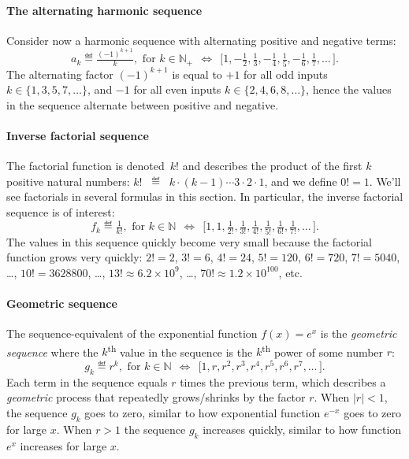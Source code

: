 		\paragraph{The alternating harmonic sequence}

			Consider now a harmonic sequence with alternating positive and negative terms:
			\[
				a_k \eqdef \tfrac{(-1)^{k+1}}{k}, \text{ for } k \in \mathbb{N}_+
				  \ \ \Leftrightarrow \ \ 
				  \big[ 1, -\tfrac{1}{2}, \tfrac{1}{3}, -\tfrac{1}{4}, \tfrac{1}{5}, -\tfrac{1}{6}, \tfrac{1}{7}, \ldots \, \big].
			\]
			The alternating factor $(-1)^{k+1}$ is equal to $+1$
			for all odd inputs $k \in \{1,3,5,7,\ldots \}$,
			and $-1$ for all even inputs $k \in \{2,4,6,8,\ldots \}$,
			hence the values in the sequence alternate between positive and negative.


		\paragraph{Inverse factorial sequence}

			The factorial function is denoted~$k!$
			and describes the product of the first $k$ positive natural numbers:
			$k! \;\; \eqdef \;\; k \cdot (k-1) \cdots 3 \cdot 2 \cdot 1$,
			and we define $0! = 1$.
			We'll see factorials in several formulas in this section.
			In particular,
			the inverse factorial sequence is of interest:
			\[
				f_k\eqdef \tfrac{1}{k!}, \text{ for } k \in \mathbb{N}
				  \ \ \Leftrightarrow \ \ 
				  \big[1, 1, \tfrac{1}{2!}, \tfrac{1}{3!}, \tfrac{1}{4!}, \tfrac{1}{5!}, \tfrac{1}{6!}, \tfrac{1}{7!}, \ldots \, \big].
			\]
			The values in this sequence quickly become very small
			because the factorial function grows very quickly:
			$2!=2$,
			$3!=6$,
			$4!=24$,
			$5!=120$,
			$6!=720$,
			$7! = 5040$, \ldots,
			$10! = 3628800$, \ldots, 
			$13! \approx 6.2 \times 10^9$, \ldots, 
			$70! \approx 1.2 \times 10^{100}$,
			etc.


		\paragraph{Geometric sequence}

			The sequence-equivalent of the exponential function $f(x) = e^x$
			is the \emph{geometric sequence}
			where the $k$\textsuperscript{th} value in the sequence
			is the $k$\textsuperscript{th} power of some number $r$:
			\[
				g_k\eqdef r^k, \text{ for } k \in \mathbb{N}
				  \ \ \Leftrightarrow \ \ 
				  \big[ 1, r, r^2, r^3, r^4, r^5, r^6, r^7, \ldots \, \big].
			\]
			Each term in the sequence equals $r$ times the previous term,
			which describes a \emph{geometric} process that repeatedly grows/shrinks by the factor $r$.
			When $|r| < 1$,
			the sequence $g_k$ goes to zero,
			similar to how exponential function $e^{-x}$ goes to zero for large $x$.
			When $r > 1$ the sequence $g_k$ increases quickly,
			similar to how function $e^{x}$ increases for large $x$.


